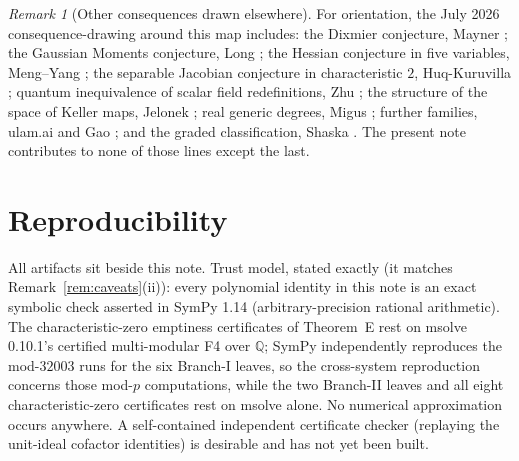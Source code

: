 \documentclass[11pt]{amsart}
\newcommand{\QQ}{\mathbb{Q}}
\theoremstyle{plain}
\theoremstyle{definition}
\theoremstyle{remark}
\newtheorem{remark}[theorem]{Remark}
\begin{document}
\begin{remark}[Other consequences drawn elsewhere]
For orientation, the July 2026 consequence-drawing around this map
includes: the Dixmier conjecture, Mayner \cite{Mayner26}; the Gaussian
Moments conjecture, Long \cite{Long26}; the Hessian conjecture in five
variables, Meng--Yang \cite{MengYang26}; the separable Jacobian conjecture
in characteristic $2$, Huq-Kuruvilla \cite{HuqKuruvilla26}; quantum
inequivalence of scalar field redefinitions, Zhu \cite{Zhu26}; the
structure of the space of Keller maps, Jelonek \cite{Jelonek26}; real
generic degrees, Migus \cite{Migus26}; further families, ulam.ai
\cite{Ulam26} and Gao \cite{Gao26}; and the graded classification, Shaska
\cite{Shaska26}. The present note contributes to none of those lines
except the last.
\end{remark}

\section{Reproducibility}\label{sec:repro}

All artifacts sit beside this note. Trust model, stated exactly (it
matches Remark~\ref{rem:caveats}(ii)): every polynomial identity in this
note is an exact symbolic check asserted in SymPy 1.14
(arbitrary-precision rational arithmetic). The characteristic-zero
emptiness certificates of Theorem~E rest on msolve 0.10.1's certified
multi-modular F4 over $\QQ$; SymPy independently reproduces the
mod-$32003$ runs for the six Branch-I leaves, so the cross-system
reproduction concerns those mod-$p$ computations, while the two
Branch-II leaves and all eight characteristic-zero certificates rest on
msolve alone. No numerical approximation occurs anywhere. A
self-contained independent certificate checker (replaying the unit-ideal
cofactor identities) is desirable and has not yet been built.
\end{document}
